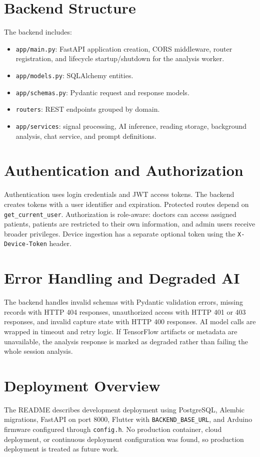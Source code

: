 \section{Backend Structure}

The backend includes:

\begin{itemize}[leftmargin=*]
    \item \texttt{app/main.py}: FastAPI application creation, CORS middleware, router registration, and lifecycle startup/shutdown for the analysis worker.
    \item \texttt{app/models.py}: SQLAlchemy entities.
    \item \texttt{app/schemas.py}: Pydantic request and response models.
    \item \texttt{routers}: REST endpoints grouped by domain.
    \item \texttt{app/services}: signal processing, AI inference, reading storage, background analysis, chat service, and prompt definitions.
\end{itemize}

\section{Authentication and Authorization}

Authentication uses login credentials and JWT access tokens. The backend creates tokens with a user identifier and expiration. Protected routes depend on \texttt{get\_current\_user}. Authorization is role-aware: doctors can access assigned patients, patients are restricted to their own information, and admin users receive broader privileges. Device ingestion has a separate optional token using the \texttt{X-Device-Token} header.

\section{Error Handling and Degraded AI}

The backend handles invalid schemas with Pydantic validation errors, missing records with HTTP 404 responses, unauthorized access with HTTP 401 or 403 responses, and invalid capture state with HTTP 400 responses. AI model calls are wrapped in timeout and retry logic. If TensorFlow artifacts or metadata are unavailable, the analysis response is marked as degraded rather than failing the whole session analysis.

\section{Deployment Overview}

The README describes development deployment using PostgreSQL, Alembic migrations, FastAPI on port 8000, Flutter with \texttt{BACKEND\_BASE\_URL}, and Arduino firmware configured through \texttt{config.h}. No production container, cloud deployment, or continuous deployment configuration was found, so production deployment is treated as future work.
